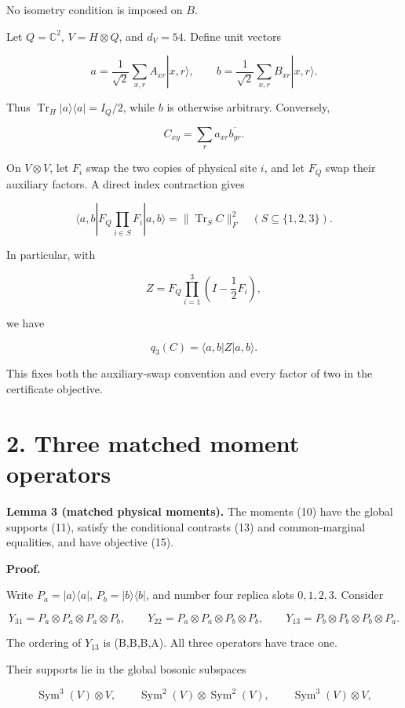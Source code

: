 \documentclass[
  11pt,
]{article}
\begin{document}
No isometry condition is imposed on \(B\).

Let \(Q=\mathbb C^2\), \(V=H\otimes Q\), and \(d_V=54\). Define unit
vectors

\[
a=\frac1{\sqrt2}\sum_{x,r}A_{xr}|x,r\rangle,\qquad
b=\frac1{\sqrt2}\sum_{x,r}B_{xr}|x,r\rangle.
\tag{6}
\]

Thus \(\operatorname{Tr}_H|a\rangle\langle a|=I_Q/2\), while \(b\) is
otherwise arbitrary. Conversely,

\[
C_{xy}=\sum_r a_{xr}\overline{b_{yr}}.
\tag{7}
\]

On \(V\otimes V\), let \(F_i\) swap the two copies of physical site
\(i\), and let \(F_Q\) swap their auxiliary factors. A direct index
contraction gives

\[
\langle a,b|F_Q\prod_{i\in S}F_i|a,b\rangle
=\|\operatorname{Tr}_S C\|_F^2
\quad(S\subseteq\{1,2,3\}).
\tag{8}
\]

In particular, with

\[
Z=F_Q\prod_{i=1}^3\left(I-\frac12F_i\right),
\]

we have

\[
q_3(C)=\langle a,b|Z|a,b\rangle.
\tag{9}
\]

This fixes both the auxiliary-swap convention and every factor of two in
the certificate objective.

\section{2. Three matched moment
operators}\label{three-matched-moment-operators}

\textbf{Lemma 3 (matched physical moments).} The moments (10) have the
global supports (11), satisfy the conditional contrasts (13) and
common-marginal equalities, and have objective (15).

\textbf{Proof.}

Write \(P_a=|a\rangle\langle a|\), \(P_b=|b\rangle\langle b|\), and
number four replica slots \(0,1,2,3\). Consider

\[
Y_{31}=P_a\otimes P_a\otimes P_a\otimes P_b,\qquad
Y_{22}=P_a\otimes P_a\otimes P_b\otimes P_b,\qquad
Y_{13}=P_b\otimes P_b\otimes P_b\otimes P_a.
\tag{10}
\]

The ordering of \(Y_{13}\) is (B,B,B,A). All three operators have trace
one.

Their supports lie in the global bosonic subspaces

\[
\operatorname{Sym}^3(V)\otimes V,\qquad
\operatorname{Sym}^2(V)\otimes\operatorname{Sym}^2(V),\qquad
\operatorname{Sym}^3(V)\otimes V,
\tag{11}
\]
\end{document}
